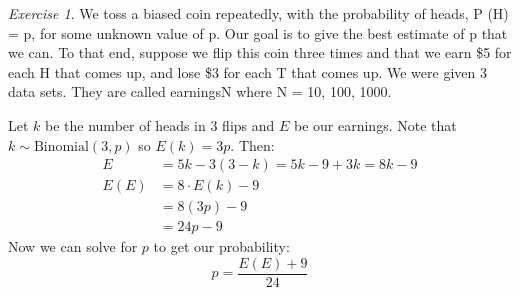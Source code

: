 \documentclass[12pt]{amsart}
\theoremstyle{remark}
\newtheorem*{exercise}{Exercise}%
\theoremstyle{mycomment}
\begin{document}
\begin{exercise}
We toss a biased coin repeatedly, with the probability of heads, P (H) = p, for some unknown value
of p. Our goal is to give the best estimate of p that we can. To that end, suppose we flip this coin three
times and that we earn \$5 for each H that comes up, and lose \$3 for each T that comes up.
We were given 3 data sets. They are called earningsN where N = 10, 100, 1000.

Let $k$ be the number of heads in 3 flips and $E$ be our earnings. Note that $k \sim \text{Binomial}(3, p)$ so $E(k) = 3p$. Then:
\begin{align*}
	E &= 5k - 3(3-k) = 5k - 9 + 3k = 8k - 9\\
	E(E) &= 8 \cdot E(k) - 9\\
			 &= 8(3p) - 9\\
			 &= 24p - 9
\end{align*}
Now we can solve for $p$ to get our probability: $$p = \frac{E(E) + 9}{24}$$


\end{exercise}
\end{document}
